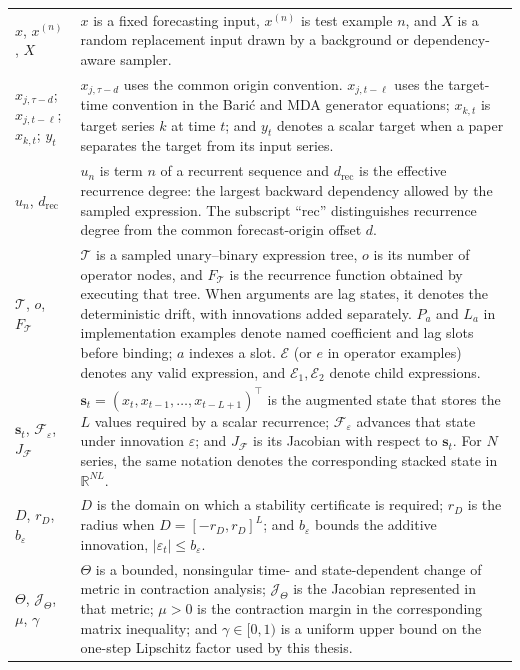 \begin{longtable}{@{}
>{\raggedright\arraybackslash}p{}
>{\raggedright\arraybackslash}p{}@{}}
$x$, $x^{(n)}$, $X$ &
$x$ is a fixed forecasting input, $x^{(n)}$ is test example $n$, and $X$ is a
random replacement input drawn by a background or dependency-aware sampler. \\

$x_{j,\tau-d}$; $x_{j,t-\ell}$; $x_{k,t}$; $y_t$ &
$x_{j,\tau-d}$ uses the common origin convention. $x_{j,t-\ell}$ uses the
target-time convention in the Bari\'c and MDA generator equations;
$x_{k,t}$ is target series $k$ at time $t$; and $y_t$ denotes a scalar target
when a paper separates the target from its input series. \\

$u_n$, $d_{\mathrm{rec}}$ &
$u_n$ is term $n$ of a recurrent sequence and $d_{\mathrm{rec}}$ is the
effective recurrence degree: the largest backward dependency allowed by the
sampled expression. The subscript ``rec'' distinguishes recurrence degree from
the common forecast-origin offset $d$. \\

$\mathcal{T}$, $o$, $F_{\mathcal{T}}$ &
$\mathcal{T}$ is a sampled unary--binary expression tree, $o$ is its number of
operator nodes, and $F_{\mathcal{T}}$ is the recurrence function obtained by
executing that tree. When arguments are lag states, it denotes the
deterministic drift, with innovations added separately. $P_a$ and $L_a$ in
implementation examples denote named coefficient and lag slots before binding;
$a$ indexes a slot. $\mathcal E$ (or $e$ in operator examples) denotes any
valid expression, and $\mathcal E_1,\mathcal E_2$ denote child expressions. \\

$\mathbf{s}_t$, $\mathcal F_{\varepsilon}$, $J_{\mathcal F}$ &
$\mathbf{s}_t=(x_t,x_{t-1},\ldots,x_{t-L+1})^\top$ is the augmented state that
stores the $L$ values required by a scalar recurrence;
$\mathcal F_{\varepsilon}$ advances that state under innovation $\varepsilon$;
and $J_{\mathcal F}$ is its Jacobian with respect to $\mathbf{s}_t$. For $N$
series, the same notation denotes the corresponding stacked state in
$\mathbb R^{NL}$. \\

$D$, $r_D$, $b_{\varepsilon}$ &
$D$ is the domain on which a stability certificate is required; $r_D$ is the
radius when $D=[-r_D,r_D]^L$; and $b_{\varepsilon}$ bounds the additive
innovation, $|\varepsilon_t|\le b_{\varepsilon}$. \\

$\Theta$, $\mathcal J_{\Theta}$, $\mu$, $\gamma$ &
$\Theta$ is a bounded, nonsingular time- and state-dependent change of metric
in contraction analysis; $\mathcal J_{\Theta}$ is the Jacobian represented in
that metric; $\mu>0$ is the contraction margin in the corresponding matrix
inequality; and $\gamma\in[0,1)$ is a uniform upper bound on the one-step
Lipschitz factor used by this thesis. \\


\end{longtable}
